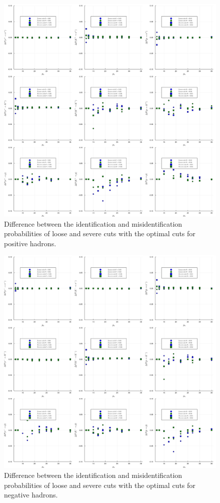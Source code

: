 \begin{figure}[!p]
	\centering
	\includegraphics[scale=0.1]{./gfx/SysPlus.png}
	\caption{Difference between the identification and misidentification probabilities of loose and severe cuts with the optimal cuts for positive hadrons.}
	\label{pic:Sysplus}
\end{figure}

\begin{figure}[!p]
	\centering
	\includegraphics[scale=0.1]{./gfx/SysMinus.png}
	\caption{Difference between the identification and misidentification probabilities of loose and severe cuts with the optimal cuts for negative hadrons.}
	\label{pic:Sysminus}
\end{figure}

